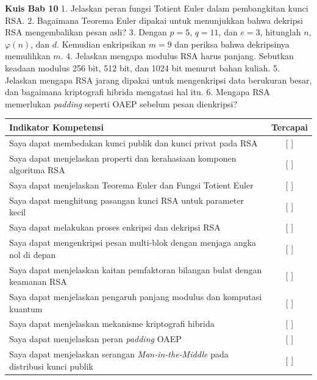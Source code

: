 
\begin{obeassessment}
\textbf{Kuis Bab 10}
1. Jelaskan peran fungsi Totient Euler dalam pembangkitan kunci RSA.
2. Bagaimana Teorema Euler dipakai untuk menunjukkan bahwa dekripsi RSA
   mengembalikan pesan asli?
3. Dengan $p = 5$, $q = 11$, dan $e = 3$, hitunglah $n$, $\varphi(n)$, dan
   $d$. Kemudian enkripsikan $m = 9$ dan periksa bahwa dekripsinya memulihkan
   $m$.
4. Jelaskan mengapa modulus RSA harus panjang. Sebutkan keadaan modulus 256
   bit, 512 bit, dan 1024 bit menurut bahan kuliah.
5. Jelaskan mengapa RSA jarang dipakai untuk mengenkripsi data berukuran
   besar, dan bagaimana kriptografi hibrida mengatasi hal itu.
6. Mengapa RSA memerlukan \textit{padding} seperti OAEP sebelum pesan
   dienkripsi?
\end{obeassessment}
\begin{competencychecklist}
\begin{tabularx}{\linewidth}{|X|c|}
\hline
Indikator Kompetensi & Tercapai \\
\hline
Saya dapat membedakan kunci publik dan kunci privat pada RSA & [ ] \\
\hline
Saya dapat menjelaskan properti dan kerahasiaan komponen algoritma RSA & [ ] \\
\hline
Saya dapat menjelaskan Teorema Euler dan Fungsi Totient Euler & [ ] \\
\hline
Saya dapat menghitung pasangan kunci RSA untuk parameter kecil & [ ] \\
\hline
Saya dapat melakukan proses enkripsi dan dekripsi RSA & [ ] \\
\hline
Saya dapat mengenkripsi pesan multi-blok dengan menjaga angka nol di depan & [ ] \\
\hline
Saya dapat menjelaskan kaitan pemfaktoran bilangan bulat dengan keamanan RSA & [ ] \\
\hline
Saya dapat menjelaskan pengaruh panjang modulus dan komputasi kuantum & [ ] \\
\hline
Saya dapat menjelaskan mekanisme kriptografi hibrida & [ ] \\
\hline
Saya dapat menjelaskan peran \textit{padding} OAEP & [ ] \\
\hline
Saya dapat menjelaskan serangan \textit{Man-in-the-Middle} pada distribusi kunci publik & [ ] \\
\hline
\end{tabularx}
\end{competencychecklist}
